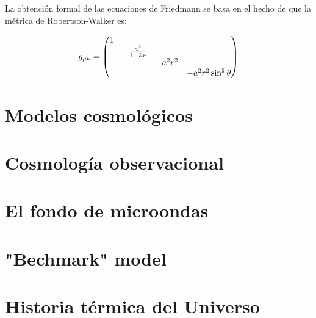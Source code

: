 La obtención formal de las ecuaciones de Friedmann se basa en el hecho de que la métrica de Robertson-Walker es:

\begin{equation}
    g_{\mu \nu} = \mqty(\dmat{1,-\frac{a^2}{1-kr},-a^2 r^2,-a^2 r^2 \sin^2 \theta})
\end{equation}

\section{Modelos cosmológicos}

\section{Cosmología observacional}

\section{El fondo de microondas}

\section{"Bechmark" model}

\section{Historia térmica del Universo}
